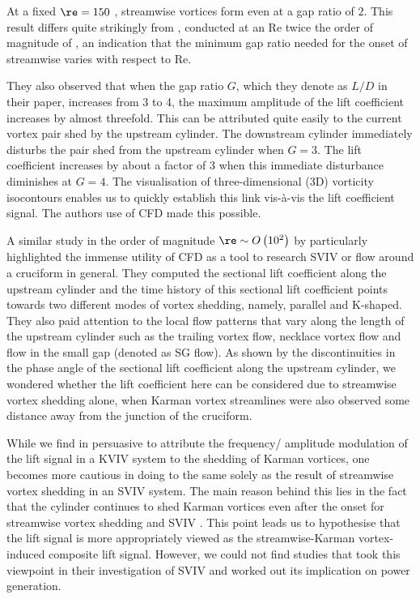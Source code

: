\documentclass[a4paper,fleqn]{cas-sc}
\begin{document}
At a fixed  $\re = 150$ , streamwise vortices form even at a gap ratio of $2$. This result differs quite strikingly from \citet{Koide2006,Koide2007}, conducted at an Re twice the order of magnitude of \citet{Deng2007}, an indication that the minimum gap ratio needed for the onset of streamwise varies with respect to Re.

They also observed that when the gap ratio $G$, which they denote as  $L/D$  in their paper, increases from 3 to 4, the maximum amplitude of the lift coefficient increases by almost threefold. This can be attributed quite easily to the current vortex pair shed by the upstream cylinder. The downstream cylinder immediately disturbs the pair shed from the upstream cylinder when  $G=3$. The lift coefficient increases by about a factor of 3 when this immediate disturbance diminishes at  $G=4$. The visualisation of three-dimensional (3D) vorticity isocontours enables us to quickly establish this link vis-\`{a}-vis the lift coefficient signal. The authors use of CFD made this possible.

A similar study in the order of magnitude $\re \sim O \left( 10^{2} \right)$ by \citet{Zhao2018a} particularly highlighted the immense utility of CFD as a tool to research SVIV or flow around a cruciform in general. They computed the sectional lift coefficient along the upstream cylinder and the time history of this sectional lift coefficient points towards two different modes of vortex shedding, namely, parallel and K-shaped. They also paid attention to the local flow patterns that vary along the length of the upstream cylinder such as the trailing vortex flow, necklace vortex flow and flow in the small gap (denoted as SG flow). As shown by the discontinuities in the phase angle of the sectional lift coefficient along the upstream cylinder, we wondered whether the lift coefficient here can be considered due to streamwise vortex shedding alone, when Karman vortex streamlines were also observed some distance away from the junction of the cruciform.

While we find in persuasive to attribute the frequency/ amplitude modulation of the lift signal in a KVIV system to the shedding of Karman vortices, one becomes more cautious in doing to the same solely as the result of streamwise vortex shedding in an SVIV system. The main reason behind this lies in the fact that the cylinder continues to shed Karman vortices even after the onset for streamwise vortex shedding and SVIV \citep{Shirakashi1989}. This point leads us to hypothesise that the lift signal is more appropriately viewed as the streamwise-Karman vortex-induced composite lift signal. However, we could not find studies that took this viewpoint in their investigation of SVIV and worked out its implication on power generation.
\end{document}
